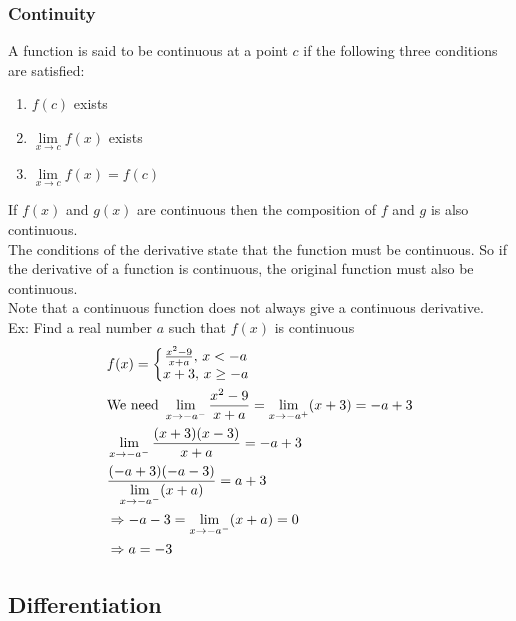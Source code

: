 \documentclass[11pt, fleqn]{article}
\begin{document}
\subsubsection{Continuity}
A function is said to be continuous at a point $c$ if the following three conditions are satisfied:
\begin{enumerate}
    \item $f(c)$ exists
    \item $\lim\limits_{x\to c}f(x)$ exists
    \item $\lim\limits_{x\to c}f(x)=f(c)$
\end{enumerate}
If $f(x)$ and $g(x)$ are continuous then the composition of $f$ and $g$ is also continuous.\\
The conditions of the derivative state that the function must be continuous. So if the derivative of a function is continuous, the original function must also be continuous.\\
Note that a continuous function does not always give a continuous derivative.\\
Ex: Find a real number $a$ such that $f(x)$ is continuous 
\begin{align*}
    &f(x)=\left\{\begin{matrix}
    \frac{x^2-9}{x+a},\, x<-a\\
    x+3,\,x\geq-a
    \end{matrix}\right.\\
    &\text{We need }\lim_{x\to-a^-}\frac{x^2-9}{x+a}=\lim_{x\to-a^+}(x+3)=-a+3\\
    &\lim_{x\to -a^-}\frac{(x+3)(x-3)}{x+a}=-a+3\\
    &\frac{(-a+3)(-a-3)}{\lim\limits_{x\to-a^-}(x+a)}=a+3\\
    &\Rightarrow-a-3=\lim_{x\to-a^-}(x+a)=0\\
    &\Rightarrow a=-3
\end{align*}












\subsection{Differentiation}
\end{document}
